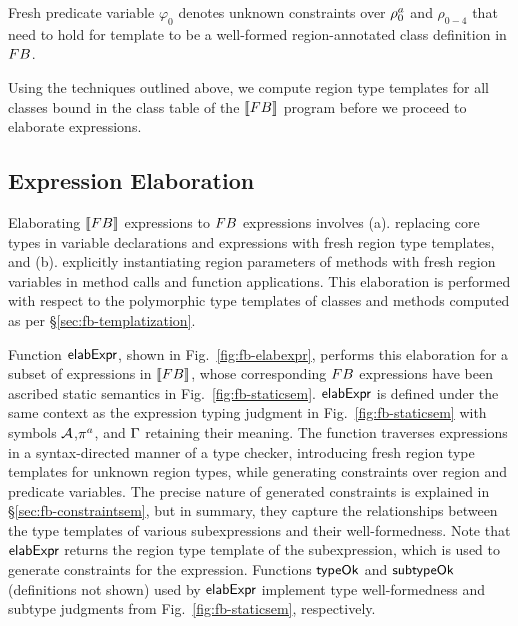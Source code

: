 Fresh predicate variable $\varphi_0$ denotes unknown constraints over
$\rho^a_0$ and $\rho_{0-4}$ that need to hold for template to be a
well-formed region-annotated class definition in ${\sc FB}$. 


Using the
techniques outlined above, we compute region type templates for all
classes bound in the class table of the $\llbracket {\sc FB} \rrbracket$ program before
we proceed to elaborate expressions.






\subsection{Expression Elaboration}

Elaborating $\llbracket {\sc FB} \rrbracket$ expressions to ${\sc FB}$ expressions involves
(a). replacing core types in variable declarations and 
expressions with fresh region type templates, and (b). explicitly
instantiating region parameters of methods with fresh region variables
in method calls and function applications. This elaboration is
performed with respect to the polymorphic type templates of classes
and methods computed as per \S\ref{sec:fb-templatization}. 

Function ${\sf elabExpr}$, shown in Fig.~\ref{fig:fb-elabexpr}, performs
this elaboration for a subset of expressions in $\llbracket {\sc FB} \rrbracket$, whose
corresponding ${\sc FB}$ expressions have been ascribed static semantics in
Fig.~\ref{fig:fb-staticsem}. ${\sf elabExpr}$ is defined under the same
context as the expression typing judgment in
Fig.~\ref{fig:fb-staticsem} with symbols ${\mathcal{A}}$,$\pi^a$, and $\Gamma$
retaining their meaning. The function traverses expressions in a
syntax-directed manner of a type checker, introducing fresh region
type templates for unknown region types, while generating constraints
over region and predicate variables. The precise nature of generated
constraints is explained in \S\ref{sec:fb-constraintsem}, but in
summary, they capture the relationships between the type templates of
various subexpressions and their well-formedness. Note that
${\sf elabExpr}$ returns the region type template of the subexpression,
which is used to generate constraints for the expression. Functions
${\sf typeOk}$ and ${\sf subtypeOk}$ (definitions not shown) used by ${\sf elabExpr}$
implement type well-formedness and subtype judgments from
Fig.~\ref{fig:fb-staticsem}, respectively.

